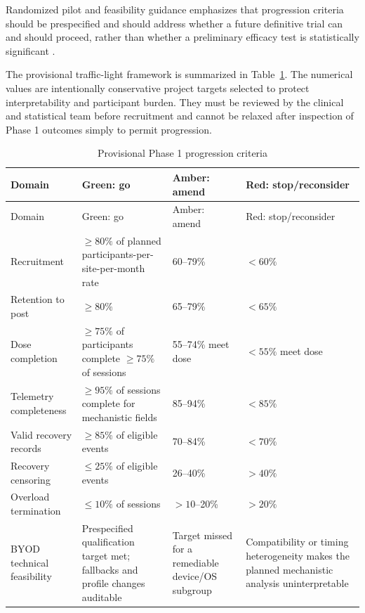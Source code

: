 Randomized pilot and feasibility guidance emphasizes that progression criteria should be prespecified and should address whether a future definitive trial can and should proceed, rather than whether a preliminary efficacy test is statistically significant \parencite{eldridge2016pilot,avery2017progression,mellor2021progression}.

The provisional traffic-light framework is summarized in Table~\ref{tab:progression}. The numerical values are intentionally conservative project targets selected to protect interpretability and participant burden. They must be reviewed by the clinical and statistical team before recruitment and cannot be relaxed after inspection of Phase 1 outcomes simply to permit progression.

\begingroup
\small
\setlength{\LTpre}{6pt}
\setlength{\LTpost}{6pt}
\renewcommand{\arraystretch}{1.1}
\begin{longtable}{p{3.0cm}p{3.0cm}p{3.0cm}p{3.0cm}}
\caption{Provisional Phase 1 progression criteria}\label{tab:progression}\\
\toprule
Domain & Green: go & Amber: amend & Red: stop/reconsider \\

\midrule
\endfirsthead
\toprule
Domain & Green: go & Amber: amend & Red: stop/reconsider \\

\midrule
\endhead
\midrule
\endfoot
\bottomrule
\endlastfoot
Recruitment & \(\geq 80\%\) of planned participants-per-site-per-month rate & 60--79\% & \(<60\%\) \\
Retention to post & \(\geq 80\%\) & 65--79\% & \(<65\%\) \\
Dose completion & \(\geq 75\%\) of participants complete \(\geq 75\%\) of sessions & 55--74\% meet dose & \(<55\%\) meet dose \\
Telemetry completeness & \(\geq 95\%\) of sessions complete for mechanistic fields & 85--94\% & \(<85\%\) \\
Valid recovery records & \(\geq 85\%\) of eligible events & 70--84\% & \(<70\%\) \\
Recovery censoring & \(\leq 25\%\) of eligible events & 26--40\% & \(>40\%\) \\
Overload termination & \(\leq 10\%\) of sessions & \(>10\)--20\% & \(>20\%\) \\
BYOD technical feasibility & Prespecified qualification target met; fallbacks and profile changes auditable & Target missed for a remediable device/OS subgroup & Compatibility or timing heterogeneity makes the planned mechanistic analysis uninterpretable \\
\end{longtable}
\endgroup

